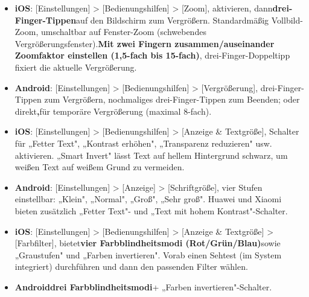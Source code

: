 
\booksubsection{:}

\begin{itemize}
  \item \textbf{iOS}: [Einstellungen] > [Bedienungshilfen] > [Zoom], aktivieren, dann\textbf{drei-Finger-Tippen}auf den Bildschirm zum Vergrößern. Standardmäßig Vollbild-Zoom, umschaltbar auf Fenster-Zoom (schwebendes Vergrößerungsfenster).\textbf{Mit zwei Fingern zusammen/auseinander Zoomfaktor einstellen (1,5-fach bis 15-fach)}, drei-Finger-Doppeltipp fixiert die aktuelle Vergrößerung.
  \item \textbf{Android}: [Einstellungen] > [Bedienungshilfen] > [Vergrößerung], drei-Finger-Tippen zum Vergrößern, nochmaliges drei-Finger-Tippen zum Beenden; oder direkt\textbf{,}für temporäre Vergrößerung (maximal 8-fach).
\end{itemize}


\begin{itemize}
  \item \textbf{iOS}: [Einstellungen] > [Bedienungshilfen] > [Anzeige \& Textgröße], Schalter für „Fetter Text", „Kontrast erhöhen", „Transparenz reduzieren" usw. aktivieren. „Smart Invert" lässt Text auf hellem Hintergrund schwarz, um weißen Text auf weißem Grund zu vermeiden.
  \item \textbf{Android}: [Einstellungen] > [Anzeige] > [Schriftgröße], vier Stufen einstellbar: „Klein", „Normal", „Groß", „Sehr groß". Huawei und Xiaomi bieten zusätzlich „Fetter Text"- und „Text mit hohem Kontrast"-Schalter.
\end{itemize}


\begin{itemize}
  \item \textbf{iOS}: [Einstellungen] > [Bedienungshilfen] > [Anzeige \& Textgröße] > [Farbfilter], bietet\textbf{vier Farbblindheitsmodi (Rot/Grün/Blau)}sowie „Graustufen" und „Farben invertieren". Vorab einen Sehtest (im System integriert) durchführen und dann den passenden Filter wählen.
  \item \textbf{Android}\textbf{drei Farbblindheitsmodi}+ „Farben invertieren"-Schalter.
\end{itemize}


